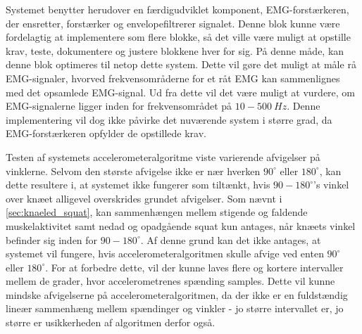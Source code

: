
Systemet benytter herudover en færdigudviklet komponent, EMG-forstærkeren, der ensretter, forstærker og envelopefiltrerer signalet. Denne blok kunne være fordelagtig at implementere som flere blokke, så det ville være muligt at opstille krav, teste, dokumentere og justere blokkene hver for sig. På denne måde, kan denne blok optimeres til netop dette system. Dette vil gøre det muligt at måle rå EMG-signaler, hvorved frekvensområderne for et råt EMG kan sammenlignes med det opsamlede EMG-signal. Ud fra dette vil det være muligt at vurdere, om EMG-signalerne ligger inden for frekvensområdet på $10-500~Hz$. Denne implementering vil dog ikke påvirke det nuværende system i større grad, da EMG-forstærkeren opfylder de opstillede krav. %

Testen af systemets accelerometeralgoritme viste varierende afvigelser på vinklerne. Selvom den største afvigelse ikke er nær hverken $90^{\circ}$ eller $180^{\circ}$, kan dette resultere i, at systemet ikke fungerer som tiltænkt, hvis $90-180^{\circ}$'s vinkel over knæet alligevel overskrides grundet afvigelser. Som nævnt i \autoref{sec:knaeled_squat}, kan sammenhængen mellem stigende og faldende muskelaktivitet samt nedad og opadgående squat kun antages, når knæets vinkel befinder sig inden for $90-180^{\circ}$. Af denne grund kan det ikke antages, at systemet vil fungere, hvis accelerometeralgoritmen skulle afvige ved enten $90^{\circ}$ eller $180^{\circ}$. For at forbedre dette, vil der kunne laves flere og kortere intervaller mellem de grader, hvor accelerometrenes spænding samples. Dette vil kunne mindske afvigelserne på accelerometeralgoritmen, da der ikke er en fuldstændig lineær sammenhæng mellem spændinger og vinkler - jo større intervallet er, jo større er usikkerheden af algoritmen derfor også.

